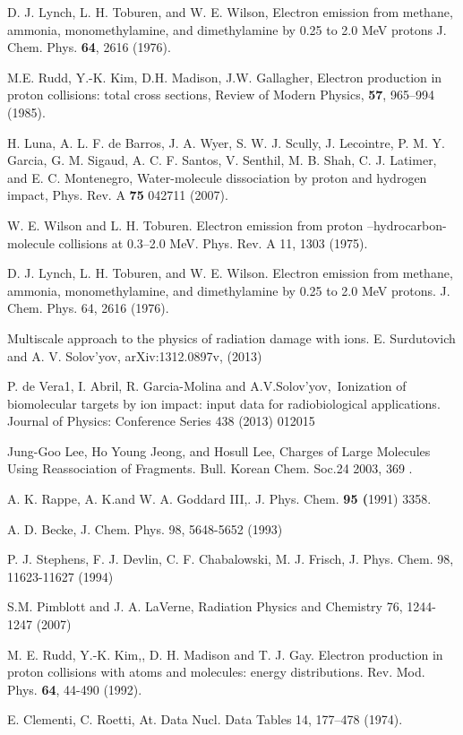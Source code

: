 \documentclass[preprint,12pt]{article}
\begin{document}
\begin{thebibliography}{99}
D. J. Lynch, L. H. Toburen, and W. E. Wilson,
Electron emission from methane, ammonia, monomethylamine, and
dimethylamine by 0.25 to 2.0 MeV protons
J. Chem. Phys. \textbf{64}, 2616 (1976).

M.E. Rudd, Y.-K. Kim, D.H. Madison, J.W. Gallagher,
Electron production in proton collisions: total cross sections,
Review of Modern Physics, \textbf{57}, 965--994 (1985).

H. Luna, A. L. F. de Barros, J. A. Wyer, S. W. J. Scully, J. Lecointre, 
P. M. Y. Garcia, G. M. Sigaud, A. C. F. Santos, V. Senthil, M. B. Shah, 
C. J. Latimer, and E. C. Montenegro,
Water-molecule dissociation by proton and hydrogen impact,
Phys. Rev. A \textbf{75} 042711 (2007).


W. E. Wilson and L. H. Toburen. Electron emission from
proton --hydrocarbon-molecule collisions at 0.3--2.0 MeV. 
Phys. Rev. A 11, 1303 (1975).

D. J. Lynch, L. H. Toburen, and W. E. Wilson. Electron
emission from methane, ammonia, monomethylamine, and dimethylamine by 0.25
to 2.0 MeV protons. 
J. Chem. Phys. 64, 2616 (1976).

Multiscale approach to the physics of radiation
damage with ions. E. Surdutovich and A. V. Solov'yov, 
arXiv:1312.0897v, (2013)

P. de Vera1, I. Abril, R. Garcia-Molina and
A.V.Solov'yov,\ Ionization of biomolecular targets by ion impact: input data
for radiobiological applications. 
Journal of Physics: Conference Series 438
(2013) 012015

Jung-Goo Lee, Ho Young Jeong, and Hosull Lee, Charges of
Large Molecules Using Reassociation of Fragments. 
Bull. Korean Chem. Soc.24 2003, 369 .

A. K. Rappe, A. K.and W. A. Goddard III,. 
J. Phys. Chem. \textbf{95 (}1991) 3358.

A. D. Becke, 
J. Chem. Phys. 98, 5648-5652 (1993) 

P. J. Stephens, F. J. Devlin, C. F. Chabalowski, M. J. Frisch,
J. Phys. Chem. 98, 11623-11627 (1994) 

S.M. Pimblott and J. A. LaVerne, Radiation
Physics and Chemistry 76, 1244-1247 (2007)

M. E. Rudd, Y.-K. Kim,, D. H. Madison and T. J. Gay.
Electron production in proton collisions with atoms and molecules: energy
distributions. 
Rev. Mod. Phys. \textbf{64}, 44-490 (1992).

E. Clementi, C. Roetti,
At. Data Nucl. Data Tables 14, 177--478 (1974).


\end{thebibliography}
\end{document}
